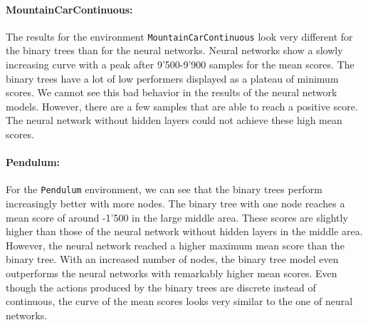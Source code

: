 \paragraph*{MountainCarContinuous:} The results for the environment \verb|MountainCarContinuous| look very different for the binary trees than for the neural networks. Neural networks show a slowly increasing curve with a peak after 9'500-9'900 samples for the mean scores. The binary trees have a lot of low performers displayed as a plateau of minimum scores. We cannot see this bad behavior in the results of the neural network models. However, there are a few samples that are able to reach a positive score. The neural network without hidden layers could not achieve these high mean scores.

\paragraph*{Pendulum:} For the \verb|Pendulum| environment, we can see that the binary trees perform increasingly better with more nodes. The binary tree with one node reaches a mean score of around -1'500 in the large middle area. These scores are slightly higher than those of the neural network without hidden layers in the middle area. However, the neural network reached a higher maximum mean score than the binary tree. With an increased number of nodes, the binary tree model even outperforms the neural networks with remarkably higher mean scores. Even though the actions produced by the binary trees are discrete instead of continuous, the curve of the mean scores looks very similar to the one of neural networks.


